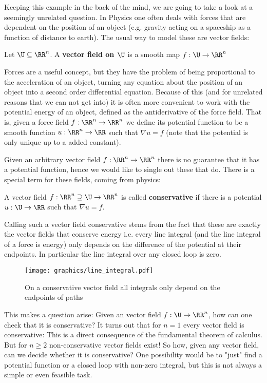 Keeping this example in the back of the mind, we are going to take a look at a seemingly unrelated
question. In Physics one often deals with forces that are dependent on the position of an object (e.g. gravity
acting on a spaceship as a function of distance to earth). The usual way to model these are vector fields:
\begin{definition}
Let $\U \subseteq \RR^n$. A \textbf{vector field on $\U$} is a smooth map $f: \U \to \RR^n$
\end{definition}

Forces are a useful concept, but they have the problem of being proportional to the acceleration
of an object, turning any equation about the position of an object into a second order differential
equation. Because of this (and for unrelated reasons that we can not get into) it is often more convenient
to work with the potential energy of an object, defined as the antiderivative of the force field. That is,
given a  force field $f: \RR^n \to \RR^n$ we define its potential function to be a smooth function $u: \RR^n \to \RR$
such that $\nabla u = f$ (note that the potential is only unique up to a added constant).

Given an arbitrary vector field $f: \RR^n \to \RR^n$ there is no guarantee that it has a potential function, hence we would like to
single out these that do. There is a special term for these fields, coming from physics:
\begin{definition}
A vector field $f: \RR^n \supseteq \U \to \RR^n$ is called \textbf{conservative} if there is a potential $u: \U \to \RR$
such that $\nabla u = f$.
\end{definition}
Calling such a vector field conservative stems from the fact that these are exactly the vector
fields that conserve energy i.e. every line integral (and the line integral of a force is
energy) only depends on the difference of the potential at their endpoints.
In particular the line integral over any closed loop is zero.
\begin{figure}
	\centering
	\texttt{[image: graphics/line\_integral.pdf]}
	\caption{On a conservative vector field all integrals only depend on the endpoints of paths}
\end{figure}

This makes a question arise: Given an vector field $f: \U \to \RR^n$, how can one check that it
is conservative? It turns out that for $n = 1$ every vector field is conservative: This is
a direct consequence of the fundamental theorem of calculus. But for $n \geq 2$ non-conservative vector
fields exist! So how, given any vector field, can we decide whether it is conservative? One possibility would
be to "just" find a potential function or a closed loop with non-zero integral, but this is not always a simple
or even feasible task.

